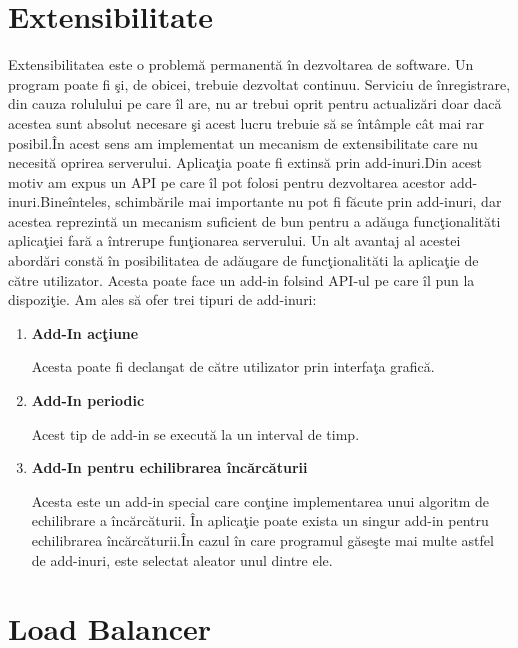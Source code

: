 \documentclass[a4paper,12pt]{report}
\begin{document}
\section{Extensibilitate}
Extensibilitatea este o problem\u a permanent\u a \^in dezvoltarea de software. Un program poate fi \c si, de obicei, 
trebuie dezvoltat continuu. Serviciu de \^inregistrare, din cauza rolulului pe care \^il are, nu ar trebui oprit 
pentru actualiz\u ari doar dac\u a acestea sunt absolut necesare \c si acest lucru trebuie s\u a se \^int\^ample
c\^at mai rar posibil.\^In acest sens am implementat un mecanism de extensibilitate care nu necesit\u a oprirea
serverului. Aplica\c tia poate fi extins\u a prin add-inuri.Din acest motiv am expus un API pe care \^il pot folosi 
pentru dezvoltarea acestor add-inuri.Bine\^inteles, schimb\u arile mai importante nu pot fi f\u acute prin add-inuri,
dar acestea reprezint\u a un mecanism suficient de bun pentru a ad\u auga func\c tionalit\u ati aplica\c tiei far\u a
a \^intrerupe fun\c tionarea serverului. Un alt avantaj al acestei abord\u ari const\u a \^in posibilitatea de 
ad\u augare de func\c tionalit\u ati la aplica\c tie de c\u atre utilizator. Acesta poate face un add-in 
folsind API-ul pe care \^il pun la dispozi\c tie.
Am ales s\u a ofer trei tipuri de add-inuri:
\begin{enumerate}
		\item \textbf{Add-In ac\c tiune}

			Acesta poate fi declan\c sat de c\u atre utilizator prin interfa\c ta grafic\u a.
		\item \textbf{Add-In periodic}

			Acest tip de add-in se execut\u a la un interval de timp.
		\item \textbf{Add-In pentru echilibrarea \^inc\u arc\u aturii}
		
			Acesta este un add-in special care con\c tine implementarea unui algoritm de echilibrare a \^inc\u arc\u aturii.
			\^In aplica\c tie poate exista un singur add-in pentru echilibrarea \^inc\u arc\u aturii.\^In cazul \^in care
			programul g\u ase\c ste mai multe astfel de add-inuri, este selectat aleator unul dintre ele.
\end{enumerate}

\section{Load Balancer}
\end{document}
